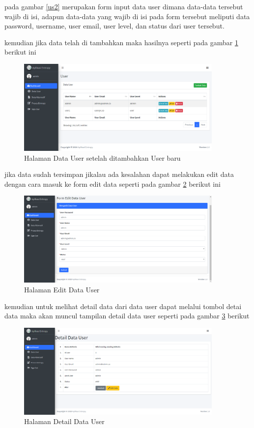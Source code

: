 pada gambar \ref{us2} merupakan form input data user dimana data-data tersebut wajib di isi, adapun data-data yang wajib di isi pada form tersebut meliputi data password, username, user email, user level, dan status dari user tersebut.\par
kemudian jika data telah di tambahkan maka hasilnya seperti pada gambar \ref{us3} berikut ini

\begin{figure}[!htbp]
	\centerline{\includegraphics[width=0.90\textwidth]{figures/us1/3.png}}
	\caption{Halaman Data User setelah ditambahkan User baru}
	\label{us3}
\end{figure}
\pagebreak
jika data sudah tersimpan jikalau ada kesalahan dapat melakukan edit data dengan cara masuk ke form edit data seperti pada gambar \ref{us4} berikut ini

\begin{figure}[!htbp]
	\centerline{\includegraphics[width=0.90\textwidth]{figures/us1/4.png}}
	\caption{Halaman Edit Data User}
	\label{us4}
\end{figure}

kemudian untuk melihat detail data dari data user dapat melalui tombol detai data maka akan muncul tampilan detail data user seperti pada gambar \ref{us5} berikut

\begin{figure}[!htbp]
	\centerline{\includegraphics[width=0.90\textwidth]{figures/us1/5.png}}
	\caption{Halaman Detail Data User}
	\label{us5}
\end{figure}


